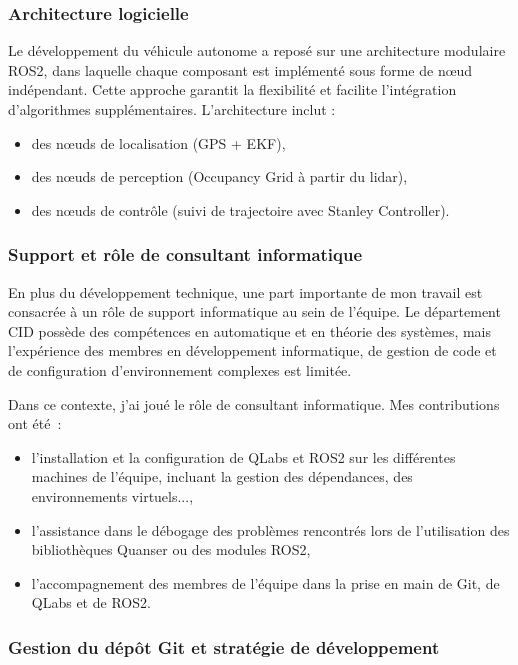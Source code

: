 \documentclass{name}
\begin{document}
\subsubsection*{Architecture logicielle}

Le développement du véhicule autonome a reposé sur une architecture modulaire ROS2, dans laquelle chaque composant est implémenté sous forme de nœud indépendant. Cette approche garantit la flexibilité et facilite l'intégration d'algorithmes supplémentaires. L'architecture inclut :

\begin{itemize}
    \item des nœuds de localisation (GPS + EKF),
    \item des nœuds de perception (Occupancy Grid à partir du lidar),
    \item des nœuds de contrôle (suivi de trajectoire avec Stanley Controller).
\end{itemize}

\subsubsection{Support et rôle de consultant informatique}

En plus du développement technique, une part importante de mon travail est consacrée à un rôle de support informatique au sein de l'équipe. Le département CID possède des compétences en automatique et en théorie des systèmes, mais l'expérience des membres en développement informatique, de gestion de code et de configuration d'environnement complexes est limitée.

Dans ce contexte, j'ai joué le rôle de consultant informatique. Mes contributions ont été :

\begin{itemize}
    \item l'installation et la configuration de QLabs et ROS2 sur les différentes machines de l'équipe, incluant la gestion des dépendances, des environnements virtuels...,
    \item l'assistance dans le débogage des problèmes rencontrés lors de l'utilisation des bibliothèques Quanser ou des modules ROS2, 
    \item l'accompagnement des membres de l'équipe dans la prise en main de Git, de QLabs et de ROS2.
\end{itemize}

\subsubsection{Gestion du dépôt Git et stratégie de développement}
\end{document}
